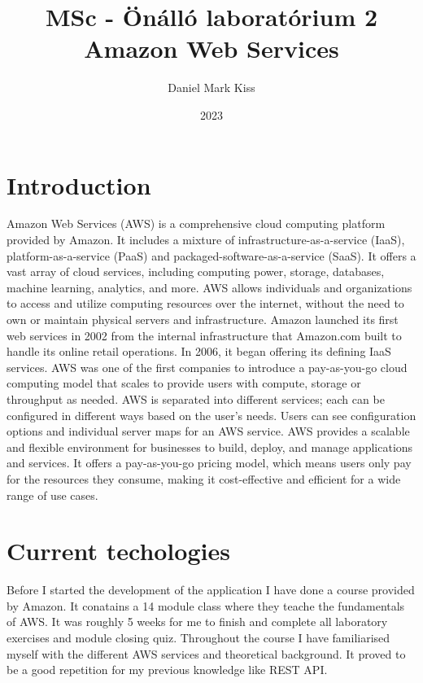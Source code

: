 \documentclass[11pt,a4paper,oneside]{report}
\title{\Huge{MSc - Önálló laboratórium 2}\\Amazon Web Services}
\author{\huge{Daniel Mark Kiss}}
\date{2023}
\begin{document}
\maketitle
\newpage
\tableofcontents
\pagebreak

\chapter{Introduction}

Amazon Web Services (AWS) is a comprehensive cloud computing platform provided by Amazon. It includes a mixture of infrastructure-as-a-service (IaaS), platform-as-a-service (PaaS) and packaged-software-as-a-service (SaaS). It offers a vast array of cloud services, including computing power, storage, databases, machine learning, analytics, and more. AWS allows individuals and organizations to access and utilize computing resources over the internet, without the need to own or maintain physical servers and infrastructure.
Amazon launched its first web services in 2002 from the internal infrastructure that Amazon.com built to handle its online retail operations. In 2006, it began offering its defining IaaS services. AWS was one of the first companies to introduce a pay-as-you-go cloud computing model that scales to provide users with compute, storage or throughput as needed.
AWS is separated into different services; each can be configured in different ways based on the user's needs. Users can see configuration options and individual server maps for an AWS service. AWS provides a scalable and flexible environment for businesses to build, deploy, and manage applications and services. It offers a pay-as-you-go pricing model, which means users only pay for the resources they consume, making it cost-effective and efficient for a wide range of use cases. \cite{techtagaws}

\chapter{Current techologies}

Before I started the development of the application I have done a course provided by Amazon. It conatains a 14 module class where they teache the fundamentals of AWS.
It was roughly 5 weeks for me to finish and complete all laboratory exercises and module closing quiz. Throughout the course I have familiarised myself with the different AWS services and theoretical background. It proved to be a good repetition for my previous knowledge like REST API.
\end{document}
